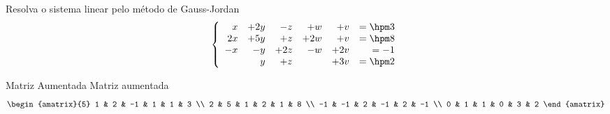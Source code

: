 \begin{question}
  Resolva o sistema linear pelo método de Gauss-Jordan
  \[
    \left\{\begin{array}{rrrrrr}
       x & + 2y & -  z & +  w & +  v & = \hpm 3 \\
      2x & + 5y & +  z & + 2w & +  v & = \hpm 8 \\
      -x & -  y & + 2z & -  w & + 2v & =     -1 \\
         &    y & +  z &      & + 3v & = \hpm 2
    \end{array}\right.
  \]
\end{question}

\begin{resolution}{Matriz Aumentada}
  Matriz aumentada
  \[
    \begin{amatrix}{5}
      1  & 2  & -1 & 1  & 1 & 3  \\
      2  & 5  & 1  & 2  & 1 & 8  \\
      -1 & -1 & 2  & -1 & 2 & -1 \\
      0  & 1  & 1  & 0  & 3 & 2
    \end{amatrix}
  \]
\end{resolution}

